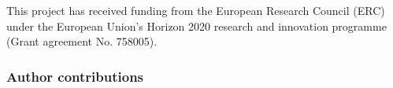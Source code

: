 \documentclass[draft]{agujournal2019}
\begin{document}
%
%

%

%




%
%
%
%
%
%
%
%


\acknowledgments
This project has received funding from the European Research Council (ERC) under the European Union’s Horizon 2020 research and innovation programme (Grant agreement No. 758005).

\subsubsection*{Author contributions}
\end{document}
